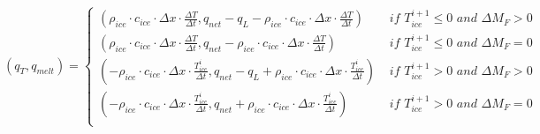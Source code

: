 \documentclass[utf8]{frontiersSCNS} %
\begin{document}
\begin{equation} (q_{T}, q_{melt}) = \left\{ \begin{array}{ll} ( \rho_{ice} \cdot c_{ice} \cdot  \Delta x \cdot
    \frac{\Delta T}{\Delta t}, q_{net}-q_{L}-\rho_{ice} \cdot c_{ice} \cdot  \Delta x \cdot \frac{\Delta T}{\Delta t}) &
    \textit{ if } T_{ice}^{i+1}\leq 0 \textit{ and } \Delta M_{F} > 0\\ ( \rho_{ice} \cdot c_{ice} \cdot  \Delta x \cdot
    \frac{\Delta T}{\Delta t}, q_{net}-\rho_{ice} \cdot c_{ice} \cdot  \Delta x \cdot \frac{\Delta T}{\Delta t}) &
    \textit{ if } T_{ice}^{i+1}\leq 0 \textit{ and } \Delta M_{F} = 0\\
        ( -\rho_{ice} \cdot c_{ice} \cdot  \Delta x \cdot \frac{T_{ice}^{i}}{\Delta t}, q_{net}-q_{L}+\rho_{ice} \cdot
        c_{ice} \cdot \Delta x \cdot \frac{T_{ice}^{i}}{\Delta t}) & \textit{ if } T_{ice}^{i+1}> 0 \textit{ and }
        \Delta M_{F} > 0\\ ( -\rho_{ice} \cdot c_{ice} \cdot  \Delta x \cdot \frac{T_{ice}^{i}}{\Delta t},
        q_{net}+\rho_{ice} \cdot c_{ice} \cdot  \Delta x \cdot \frac{T_{ice}^{i}}{\Delta t}) & \textit{ if }
    T_{ice}^{i+1}> 0 \textit{ and } \Delta M_{F} = 0\\ \end{array} \right.  \label{eqn:qt} \end{equation}
\end{document}
